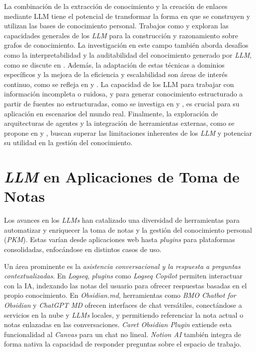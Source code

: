 La combinación de la extracción de conocimiento y la creación de enlaces mediante LLM tiene el potencial de transformar la forma en que se construyen y utilizan las bases de conocimiento personal. Trabajos como \parencite{zhuLLMsKnowledgeGraph2024} y \parencite{machadoLLMStoreLeveraging2024} exploran las capacidades generales de los \textit{LLM} para la construcción y razonamiento sobre grafos de conocimiento. La investigación en este campo también aborda desafíos como la interpretabilidad y la auditabilidad del conocimiento generado por \textit{LLM}, como se discute en \parencite{fengOntologygroundedAutomaticKnowledge2024}. Además, la adaptación de estas técnicas a dominios específicos y la mejora de la eficiencia y escalabilidad son áreas de interés continuo, como se refleja en \parencite{biLPNLScalableLink2024} y \parencite{parkEnhancingFutureLink2024}. La capacidad de los LLM para trabajar con información incompleta o ruidosa, y para generar conocimiento estructurado a partir de fuentes no estructuradas, como se investiga en \parencite{songOpenFactFactualityEnhanced2023} y \parencite{qianOpenDomainKnowledge2023}, es crucial para su aplicación en escenarios del mundo real. Finalmente, la exploración de arquitecturas de agentes y la integración de herramientas externas, como se propone en \parencite{kommineniHumanExpertsMachines2024} y \parencite{abolhasaniLeveragingLLMAutomated2024}, buscan superar las limitaciones inherentes de los \textit{LLM} y potenciar su utilidad en la gestión del conocimiento.

\section{\textit{LLM} en Aplicaciones de Toma de Notas}
\label{sec:integracion_llm_pkm}
Los avances en los \textit{LLMs} han catalizado una diversidad de herramientas para automatizar y enriquecer la toma de notas y la gestión del conocimiento personal (\textit{PKM}). Estas varían desde aplicaciones web hasta \textit{plugins} para plataformas consolidadas, enfocándose en distintos casos de uso.

Un área prominente es la \textit{asistencia conversacional y la respuesta a preguntas contextualizadas}. En \textit{Logseq}, \textit{plugins} como \textit{Logseq Copilot} permiten interactuar con la IA, indexando las notas del usuario para ofrecer respuestas basadas en el propio conocimiento. En \textit{Obsidian.md}, herramientas como \textit{BMO Chatbot for Obsidian} y \textit{ChatGPT MD} ofrecen interfaces de chat versátiles, conectándose a servicios en la nube y \textit{LLMs} locales, y permitiendo referenciar la nota actual o notas enlazadas en las conversaciones. \textit{Caret Obsidian Plugin} extiende esta funcionalidad al \textit{Canvas} para un chat no lineal. \textit{Notion AI} también integra de forma nativa la capacidad de responder preguntas sobre el espacio de trabajo.

